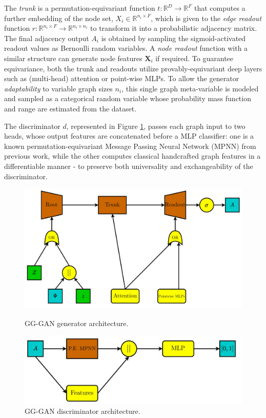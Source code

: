 The \emph{trunk} is a permutation-equivariant function $t: \mathbb{R}^D \to \mathbb{R}^{F}$ that computes a further embedding of the node set, $X_i \in \mathbb{R}^{n_i \times F}$, which is given to the \emph{edge readout} function $r: \mathbb{R}^{n_i \times F} \to \mathbb{R}^{n_i \times n_i}$ to transform it into a probabilistic adjacency matrix. The final adjacency output $A_i$ is obtained by sampling the sigmoid-activated readout values as Bernoulli random variables. A \emph{node readout} function with a similar structure can generate node features $\mathbf{X}_i$ if required. To guarantee equivariance, both the trunk and readouts utilize provably-equivariant deep layers such as (multi-head) attention or point-wise MLPs. To allow the generator \emph{adaptability} to variable graph sizes $n_i$, this single graph meta-variable is modeled and sampled as a categorical random variable whose probability mass function and range are estimated from the dataset.

The discriminator $d$, represented in Figure \ref{fig:gg_gan_d}, passes each graph input to two heads, whose output features are concatenated before a MLP classifier: one is a known permutation-equivariant Message Passing Neural Network (MPNN) from previous work, while the other computes classical handcrafted graph features in a differentiable manner - to preserve both universality and exchangeability of the discriminator.

\begin{figure}
    \centering
    \begin{minipage}{0.475\textwidth}
    \centering
    \includegraphics[width=\textwidth]{figures/gggcrp/gg_gan_g.pdf}
    \caption{GG-GAN generator architecture.}
    \label{fig:gg_gan_g}    
    \end{minipage}
    \hfill
    \begin{minipage}{0.475\textwidth}
    \centering
    \includegraphics[width=\textwidth]{figures/gggcrp/gg_gan_d.pdf}
    \caption{GG-GAN discriminator architecture.}
    \label{fig:gg_gan_d}    
    \end{minipage}
\end{figure}

